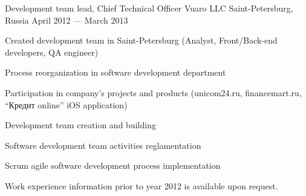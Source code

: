 \begin{cventries}
  \cventry
    {Development team lead, Chief Technical Officer} %
    {Vuaro LLC} %
    {Saint-Petersburg, Russia} %
    {April 2012 --- March 2013} %
    {
      \begin{cvitems} %
        \item {Created development team in Saint-Petersburg (Analyst, Front/Back-end developers, QA engineer)}
        \item {Process reorganization in software development department}
        \item {Participation in company’s projects and products (unicom24.ru, financemart.ru, “Кредит online” iOS application)}
        \item {Development team creation and building}
        \item {Software development team activities reglamentation}
        \item {Scrum agile software development process implementation}
      \end{cvitems}
    }

    Work experience information prior to year 2012 is available upon request.

\end{cventries}
